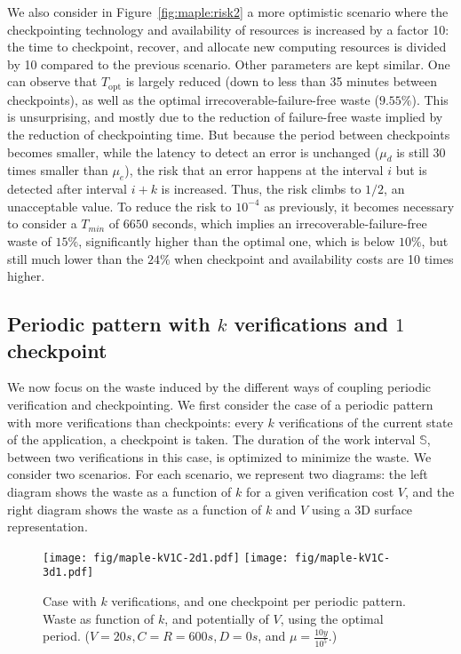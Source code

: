 \documentclass[10pt,table]{article}
\newcommand{\ema}[1]{\ensuremath{#1}\xspace}
\newcommand{\mue}{\ema{\mu_{e}}}
\newcommand{\mud}{\ema{\mu_{d}}}
\newcommand{\ccc}{\ema{C}}
\newcommand{\rrr}{\ema{R}}
\newcommand{\ddd}{\ema{D}}
\newcommand{\vvv}{\ema{V}}
\newcommand{\sss}{\ema{\mathbb{S}}}
\newcommand{\muplatform}{\mu}
\newcommand{\Topt}{\ema{T_{\text{opt}}}}
\begin{document}
We also consider in Figure~\ref{fig:maple:risk2} a more optimistic scenario where the
checkpointing technology and availability of resources is increased by
a factor 10: the time to checkpoint, recover, and allocate new
computing resources is divided by 10 compared to the previous
scenario. Other parameters are kept similar. One can observe that
$\Topt$ is largely reduced (down to less than 35 minutes between checkpoints), 
as well as the optimal irrecoverable-failure-free waste ($9.55\%$). 
This is unsurprising, and mostly due to the reduction of
failure-free waste implied by the reduction of checkpointing time. But
because the period between checkpoints becomes smaller, while the
latency to detect an error is unchanged ($\mud$ is still 30 times smaller than
 $\mue$), the risk that an error happens at the
interval $i$ but is detected after interval $i+k$ is increased. Thus,
the risk climbs to $1/2$, an unacceptable value. To reduce the risk
to $10^{-4}$ as previously, it becomes necessary to consider a
$T_{min}$ of $6650$ seconds, which implies an irrecoverable-failure-free waste of $15\%$,
significantly higher than the optimal one, which is  below $10\%$, but still
much lower than the $24\%$ when checkpoint and
availability costs are 10 times higher.

\subsection{Periodic pattern with $k$ verifications and $1$ checkpoint}
\label{sec.evaluation.kv1c}

We now focus on the waste induced by the different ways of coupling
periodic verification and checkpointing. We first consider the case of a
periodic pattern with more verifications than checkpoints: every $k$
verifications of the current state of the application, a
checkpoint is taken. The duration of the work interval \sss, between
two verifications in this case, is optimized to minimize the
waste. We consider two scenarios. For each scenario, we represent two diagrams: the left diagram
shows the waste as a function of $k$ for a given verification cost \vvv,
and the right diagram shows the waste as a function of $k$ and \vvv
using a 3D surface representation.

\begin{figure}
\begin{center}
\texttt{[image: fig/maple-kV1C-2d1.pdf]}
\texttt{[image: fig/maple-kV1C-3d1.pdf]}
\caption{Case with $k$ verifications, and one checkpoint per
periodic  pattern. Waste as function of $k$, and potentially of $V$,
using the optimal period.
\footnotesize{($\vvv=20s, \ccc = \rrr = 600s, \ddd = 0s$, and $\muplatform = \frac{10y}{10^5}$.)}
\vspace{-2\baselineskip}
\label{fig:maple:kV1C1}}
\end{center}
\end{figure}
\end{document}
